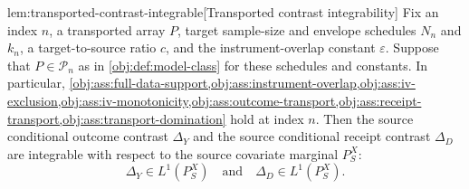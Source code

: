 \documentclass[11pt]{article}
\begin{document}
\begin{lemmav}{lem:transported-contrast-integrable}[Transported contrast integrability]
Fix an index \(n\), a transported array \(P\), target sample-size and envelope schedules \(N_n\) and \(k_n\), a target-to-source ratio \(c\), and the instrument-overlap constant \(\varepsilon\). Suppose that \(P\in\mathcal P_n\) as in \cref{obj:def:model-class} for these schedules and constants. In particular, \cref{obj:ass:full-data-support,obj:ass:instrument-overlap,obj:ass:iv-exclusion,obj:ass:iv-monotonicity,obj:ass:outcome-transport,obj:ass:receipt-transport,obj:ass:transport-domination} hold at index \(n\). Then the source conditional outcome contrast \(\Delta_Y\) and the source conditional receipt contrast \(\Delta_D\) are integrable with respect to the source covariate marginal \(P_S^X\):
\[
\Delta_Y\in L^1(P_S^X)
\quad\text{and}\quad
\Delta_D\in L^1(P_S^X).
\]
\end{lemmav}
\end{document}
